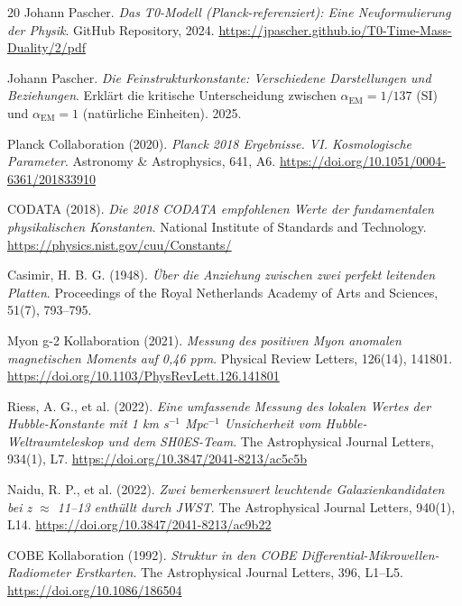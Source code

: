 	
	\begin{thebibliography}{20}
		Johann Pascher.
		\textit{Das T0-Modell (Planck-referenziert): Eine Neuformulierung der Physik}.
		GitHub Repository, 2024.
		\url{https://jpascher.github.io/T0-Time-Mass-Duality/2/pdf}
		
		Johann Pascher.
		\textit{Die Feinstrukturkonstante: Verschiedene Darstellungen und Beziehungen}.
		Erklärt die kritische Unterscheidung zwischen $\alpha_{\text{EM}} = 1/137$ (SI) und $\alpha_{\text{EM}} = 1$ (natürliche Einheiten).
		2025.
		
		Planck Collaboration (2020). 
		\textit{Planck 2018 Ergebnisse. VI. Kosmologische Parameter}. 
		Astronomy \& Astrophysics, 641, A6. 
		\url{https://doi.org/10.1051/0004-6361/201833910}
		
		CODATA (2018). 
		\textit{Die 2018 CODATA empfohlenen Werte der fundamentalen physikalischen Konstanten}. 
		National Institute of Standards and Technology. 
		\url{https://physics.nist.gov/cuu/Constants/}
		
		Casimir, H. B. G. (1948). 
		\textit{Über die Anziehung zwischen zwei perfekt leitenden Platten}. 
		Proceedings of the Royal Netherlands Academy of Arts and Sciences, 51(7), 793--795.
		
		Myon g-2 Kollaboration (2021). 
		\textit{Messung des positiven Myon anomalen magnetischen Moments auf 0,46 ppm}. 
		Physical Review Letters, 126(14), 141801. 
		\url{https://doi.org/10.1103/PhysRevLett.126.141801}
		
		Riess, A. G., et al. (2022). 
		\textit{Eine umfassende Messung des lokalen Wertes der Hubble-Konstante mit 1 km s$^{-1}$ Mpc$^{-1}$ Unsicherheit vom Hubble-Weltraumteleskop und dem SH0ES-Team}. 
		The Astrophysical Journal Letters, 934(1), L7. 
		\url{https://doi.org/10.3847/2041-8213/ac5c5b}
		
		Naidu, R. P., et al. (2022). 
		\textit{Zwei bemerkenswert leuchtende Galaxienkandidaten bei z $\approx$ 11--13 enthüllt durch JWST}. 
		The Astrophysical Journal Letters, 940(1), L14. 
		\url{https://doi.org/10.3847/2041-8213/ac9b22}
		
		COBE Kollaboration (1992). 
		\textit{Struktur in den COBE Differential-Mikrowellen-Radiometer Erstkarten}. 
		The Astrophysical Journal Letters, 396, L1--L5. 
		\url{https://doi.org/10.1086/186504}
	\end{thebibliography}
